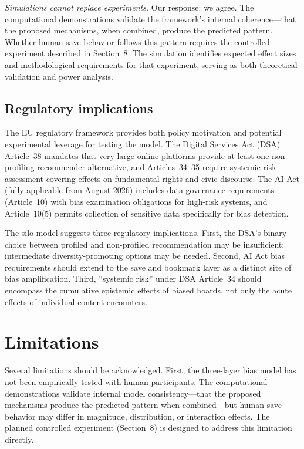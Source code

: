 \documentclass[12pt,a4paper]{article}
\begin{document}
\emph{Simulations cannot replace experiments.}
Our response: we agree.
The computational demonstrations validate the framework's internal coherence---that the proposed mechanisms, when combined, produce the predicted pattern.
Whether human save behavior follows this pattern requires the controlled experiment described in Section~8.
The simulation identifies expected effect sizes and methodological requirements for that experiment, serving as both theoretical validation and power analysis.


\subsection{Regulatory implications}

The EU regulatory framework provides both policy motivation and potential experimental leverage for testing the model.
The Digital Services Act (DSA) Article~38 mandates that very large online platforms provide at least one non-profiling recommender alternative, and Articles~34--35 require systemic risk assessment covering effects on fundamental rights and civic discourse.
The AI Act (fully applicable from August 2026) includes data governance requirements (Article~10) with bias examination obligations for high-risk systems, and Article~10(5) permits collection of sensitive data specifically for bias detection.

The silo model suggests three regulatory implications.
First, the DSA's binary choice between profiled and non-profiled recommendation may be insufficient; intermediate diversity-promoting options may be needed.
Second, AI Act bias requirements should extend to the save and bookmark layer as a distinct site of bias amplification.
Third, ``systemic risk'' under DSA Article~34 should encompass the cumulative epistemic effects of biased hoards, not only the acute effects of individual content encounters.


\section{Limitations}

Several limitations should be acknowledged.
First, the three-layer bias model has not been empirically tested with human participants.
The computational demonstrations validate internal model consistency---that the proposed mechanisms produce the predicted pattern when combined---but human save behavior may differ in magnitude, distribution, or interaction effects.
The planned controlled experiment (Section~8) is designed to address this limitation directly.
\end{document}
